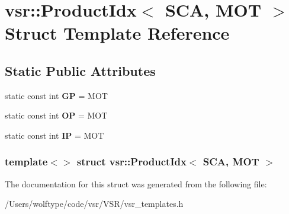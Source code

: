 \hypertarget{structvsr_1_1_product_idx_3_01_s_c_a_00_01_m_o_t_01_4}{\section{vsr\-:\-:Product\-Idx$<$ S\-C\-A, M\-O\-T $>$ Struct Template Reference}
\label{structvsr_1_1_product_idx_3_01_s_c_a_00_01_m_o_t_01_4}
}
\subsection*{Static Public Attributes}
\begin{DoxyCompactItemize}
\item 
\hypertarget{structvsr_1_1_product_idx_3_01_s_c_a_00_01_m_o_t_01_4_a26e0acd27f7aee330e75db55cf2539ea}{static const int {\bfseries G\-P} = M\-O\-T}\label{structvsr_1_1_product_idx_3_01_s_c_a_00_01_m_o_t_01_4_a26e0acd27f7aee330e75db55cf2539ea}

\item 
\hypertarget{structvsr_1_1_product_idx_3_01_s_c_a_00_01_m_o_t_01_4_ac38b45e90960b75146b163bbd79385ed}{static const int {\bfseries O\-P} = M\-O\-T}\label{structvsr_1_1_product_idx_3_01_s_c_a_00_01_m_o_t_01_4_ac38b45e90960b75146b163bbd79385ed}

\item 
\hypertarget{structvsr_1_1_product_idx_3_01_s_c_a_00_01_m_o_t_01_4_a3e5b91f1cd9c1545b4a00af9037d3d09}{static const int {\bfseries I\-P} = M\-O\-T}\label{structvsr_1_1_product_idx_3_01_s_c_a_00_01_m_o_t_01_4_a3e5b91f1cd9c1545b4a00af9037d3d09}

\end{DoxyCompactItemize}
\subsubsection*{template$<$$>$ struct vsr\-::\-Product\-Idx$<$ S\-C\-A, M\-O\-T $>$}



The documentation for this struct was generated from the following file\-:\begin{DoxyCompactItemize}
\item 
/\-Users/wolftype/code/vsr/\-V\-S\-R/vsr\-\_\-templates.\-h\end{DoxyCompactItemize}
